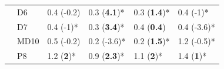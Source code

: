 \documentclass[letterpaper,12pt,oneside]{article}\usepackage[]{graphicx}\usepackage[]{color}
\begin{document}
\begin{table}[!tbp]
\begin{center}
\begin{tabular}{lllll}
~~D6&0.4 \footnotesize{(-0.2)}&0.3 \footnotesize{(\textbf{4.1})*}&0.3 \footnotesize{(\textbf{1.4})*}&0.4 \footnotesize{(-1)*}\tabularnewline
~~D7&0.4 \footnotesize{(-1)*}&0.3 \footnotesize{(\textbf{3.4})*}&0.4 \footnotesize{(\textbf{0.4})}&0.4 \footnotesize{(-3.6)*}\tabularnewline
~~MD10&0.5 \footnotesize{(-0.2)}&0.2 \footnotesize{(-3.6)*}&0.2 \footnotesize{(\textbf{1.5})*}&1.2 \footnotesize{(-0.5)*}\tabularnewline
~~P8&1.2 \footnotesize{(\textbf{2})*}&0.9 \footnotesize{(\textbf{2.3})*}&1.1 \footnotesize{(\textbf{2})*}&1.4 \footnotesize{(\textbf{1})*}\tabularnewline
\hline
\end{tabular}\end{center}
\end{table}


\end{document}
